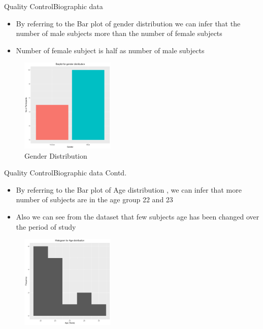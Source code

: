 \documentclass{beamer}
\begin{document}
\begin{frame}{Quality Control}{Biographic data }

  \begin{itemize}
  \item {
    By referring to the Bar plot of gender distribution we can infer that the number of male subjects more than the number of female subjects 
  }
  \item {   
    Number of female subject is half as number of male subjects 
  }
    \end{itemize}
    \begin{figure}
	\includegraphics[width=0.4\textwidth]{1_gender.pdf}
	\caption{Gender Distribution}
\end{figure}
 \end{frame}
\begin{frame}{Quality Control}{Biographic data Contd. }

  \begin{itemize}
  \item {
    By referring to the Bar plot of Age distribution , we can infer that more number of subjects are in the age group 22 and 23
  }
  \item {   
   Also we can see from the dataset that few subjects age has been changed over the period of study 
  }
    \end{itemize}
    \begin{figure}
	\includegraphics[width=0.4\textwidth]{1_age.pdf}
	
\end{figure}
 \end{frame}
\end{document}
